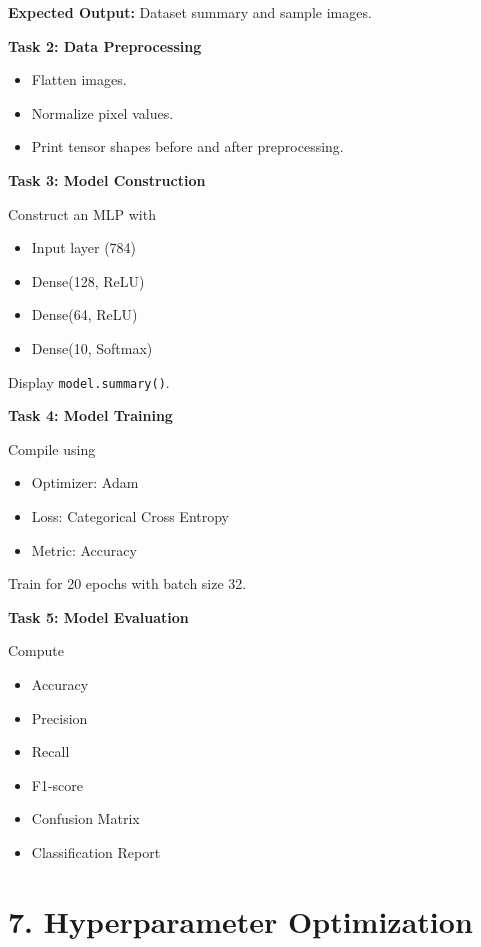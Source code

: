 \documentclass[11pt]{article}
\begin{document}
\textbf{Expected Output:}
Dataset summary and sample images.

\bigskip

\textbf{Task 2: Data Preprocessing}

\begin{itemize}
\item Flatten images.
\item Normalize pixel values.
\item Print tensor shapes before and after preprocessing.
\end{itemize}

\bigskip

\textbf{Task 3: Model Construction}

Construct an MLP with

\begin{itemize}
\item Input layer (784)
\item Dense(128, ReLU)
\item Dense(64, ReLU)
\item Dense(10, Softmax)
\end{itemize}

Display \texttt{model.summary()}.

\bigskip

\textbf{Task 4: Model Training}

Compile using

\begin{itemize}
\item Optimizer: Adam
\item Loss: Categorical Cross Entropy
\item Metric: Accuracy
\end{itemize}

Train for 20 epochs with batch size 32.

\bigskip

\textbf{Task 5: Model Evaluation}

Compute

\begin{itemize}
\item Accuracy
\item Precision
\item Recall
\item F1-score
\item Confusion Matrix
\item Classification Report
\end{itemize}

\section*{7. Hyperparameter Optimization}
\end{document}
